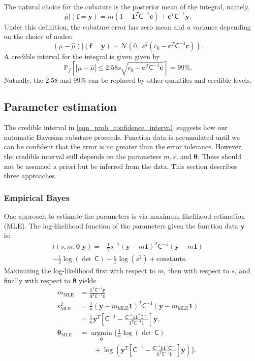 \documentclass[twocolumn]{svjour3}          %
\newcommand{\bm}[1]{\boldsymbol{#1}}
\newcommand{\vtheta}{{\bm{\theta}}}
\newcommand{\vc}{\bm{c}}
\newcommand{\vf}{\bm{f}}
\newcommand{\vy}{\bm{y}}
\newcommand{\vone}{\bm{1}}
\newcommand{\mC}{\mathsf{C}}
\newcommand{\mCInv}{{\mathsf{C}^{-1}}}
\newcommand{\calN}{\mathcal{N}}
\newcommand{\hmu}{\widehat{\mu}}
\newcommand{\MLE}{\text{MLE}}
\providecommand{\argmin}{\operatorname*{argmin}}
\begin{document}
The natural choice for  the cubature is the posterior mean of the integral, namely, 
\begin{equation}
\label{eqn:BayesCub}
\widehat{\mu}  \vert ( \vf = \vy)
= m(1 - \vone^T  \mC^{-1}\vc )
+ \vc^T \mC^{-1} \vy.
\end{equation}
Under this definition, the cubature error has zero mean and a variance depending on the choice of nodes:
\begin{equation*}
(\mu-\hmu) | (\vf = \vy)
 \sim  \calN 
\left(
0, \;
s^2 (c_0 - \vc^T\mC^{-1}\vc) 
\right).
\end{equation*}
A credible interval for the integral is given given by 
\begin{equation}
\label{eqn_prob_confidence_interval}
\mathbb{P}_f \left[
|\mu-\hmu| \leq  2.58 s \sqrt{c_0 - \vc^T\mC^{-1}\vc } 
\right] = 99\%.
\end{equation}
Natually, the $2.58$ and $99\%$ can be replaced by other quantiles and credible levels.


\subsection{Parameter estimation}
The credible interval in \eqref{eqn_prob_confidence_interval} suggests how our automatic Bayesian cubature proceeds.  Function data is accumulated until we can be confident that the error is no greater than the error tolerance.  However, the credible interval still depends on the parameters $m, s$, and $\vtheta$.  These should not be assumed a priori but be inferred from the data.  This section describes three approaches.

\subsubsection{Empirical Bayes}
One approach to estimate the parameters is via maximum likelihood estimation (MLE).  The log-likelihood function of the parameters given the function data $\vy$ is:
\begin{multline}
l(s,m,\vtheta | \vy)
= -\frac{1}{2} s^{-2} (\vy-m\vone)^T\mCInv(\vy-m\vone) 
\\
 - \frac{1}{2} \log(\det\, \mC) - \frac{n}{2} \log(s^2) + \text{constants.}
\end{multline}
Maximizing the log-likelihood first with respect to $m$, then with respect to $s$, and finally with respect to $\vtheta$ yields
\begin{align}
\label{eqn_m_MLE}
m_\MLE &= \frac{\vone^T \mCInv \vy }{ \vone^T \mCInv \vone} \\
\nonumber
s^2_{\MLE}  
&= \frac{1}{n} (\vy-m_{\MLE}\vone)^T\mCInv(\vy-m_{\MLE}\vone) 
\\
\label{eqn_s2_MLE}
&= 
\frac{1}{n}
\vy^T 
\left[ 
\mCInv - 
\frac{ \mCInv \vone \vone^T \mCInv }{\vone^T\mCInv \vone}
\right] \vy, \\
\label{eqn:thetaMLE}
\vtheta_\MLE
&= 
\argmin_{\vtheta}
\biggl \{
 \frac{1}{n} \log(\det\, \mC) \\
 & \qquad + 
 \log\left(\vy^T 
 \left[ 
 \mCInv - 
 \frac{ \mCInv \vone \vone^T \mCInv }{\vone^T\mCInv \vone}
 \right] \vy 
 \right) 
\biggr \}.
\end{align}
\end{document}
